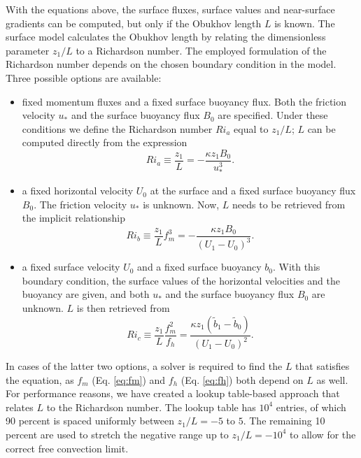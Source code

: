 \documentclass[gmd,manuscript]{copernicus}
\begin{document}
With the equations above, the surface fluxes, surface values and near-surface gradients can be computed, but only if the Obukhov length $L$ is known. The surface model calculates the Obukhov length by relating the dimensionless parameter $z_1/ L$ to a Richardson number. The employed formulation of the Richardson number depends on the chosen boundary condition in the model. Three possible options are available:
\begin{itemize}
	\item fixed momentum fluxes and a fixed surface buoyancy flux. Both the friction velocity $u_*$ and the surface buoyancy flux $B_0$ are specified. Under these conditions we define the Richardson number $Ri_a$ equal to $z_1/L$; $L$ can be computed directly from the expression
	\begin{equation}
	Ri_a \equiv \dfrac{z_1}{L} = - \dfrac{\kappa z_1 B_0}{u_*^3}.
	\end{equation}
	\item a fixed horizontal velocity $U_0$ at the surface and a fixed surface buoyancy flux $B_0$. The friction velocity $u_*$ is unknown. Now,  $L$ needs to be retrieved from the implicit relationship 
	\begin{equation}
	Ri_b \equiv \dfrac{z_1}{L} f_m^3 = - \dfrac{\kappa z_1 B_0}{ \left(U_1 - U_0 \right)^3}.
	\end{equation}
	\item a fixed surface velocity $U_0$ and a fixed surface buoyancy $b_0$. With this boundary condition, the surface values of the horizontal velocities and the buoyancy are given, and both $u_*$ and the surface buoyancy flux $B_0$ are unknown. $L$ is then retrieved from
	\begin{equation}
	Ri_c \equiv \dfrac{z_1}{L} \dfrac{f_m^2}{f_h} = \dfrac{\kappa z_1 \left(\widetilde{b}_1 - \widetilde{b}_0 \right)}{ \left(U_1 - U_0 \right)^2}.
	\end{equation}
\end{itemize}
In cases of the latter two options, a solver is required to find the $L$ that satisfies the equation, as $f_m$ (Eq. \ref{eq:fm}) and $f_h$ (Eq.  \ref{eq:fh}) both depend on $L$ as well. For performance reasons, we have created a lookup table-based approach that relates $L$ to the Richardson number. The lookup table has $10^4$ entries, of which 90 percent is spaced uniformly between $z_1/L = -5$ to $5$. The remaining 10 percent are used to stretch the negative range up to $z_1/L = -10^4$ to allow for the correct free convection limit. 
\end{document}
